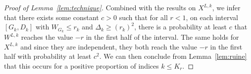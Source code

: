 \documentclass[10pt,a4paper]{amsart}
\begin{document}
\begin{proof}[Proof of Lemma~\ref{lem:technique}]
Combined with the results on $X^{L,k}$, we infer that there exists some constant $c > 0$ such that for all $r<1$, on each interval $[G_k,D_k]$ with $W_{G_k} \leq r_{k}$ and $\Delta_k \geq (r_{k})^2$, there is a probability at least $c$ that $W^{L,k}$ reaches the value $-r$ in the first half of the interval. The same holds for $X^{L,k}$ and since they are independent, they both reach the value $-r$ in the first half with probability at least $c^2$. We can then conclude from Lemma~\ref{lem:ruine} that this occurs for a positive proportion of indices $k \leq K_r$.
\end{proof}
\end{document}
